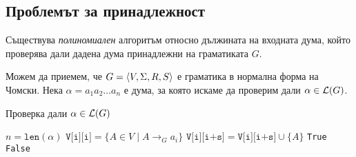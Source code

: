 \subsection{Проблемът за принадлежност}

\begin{theorem}
  Съществува {\em полиномиален} алгоритъм относно дължината на входната дума, който проверява дали дадена дума принадлежни на граматиката $G$.
\end{theorem}
Можем да приемем, че $G = \langle{V,\Sigma,R,S}\rangle$ е граматика в нормална форма на Чомски.
Нека $\alpha = a_1a_2\dots a_n$ е дума, за която искаме да проверим дали $\alpha \in \mathcal{L}(G)$.
\begin{algorithm}[H]
  \caption{Проверка дали $\alpha \in \mathcal{L}(G)$}
  \label{alg:belongs-to-grammar}
  \begin{algorithmic}[1]
    \State $n = \texttt{len}(\alpha)$ 
    \State $\texttt{V[i][i]} = \{A \in V \mid A\to_G a_i\}$ \label{alg:cyk:initial}
    \Else
    \EndIf
    \EndFor
    \ForAll{$s \in [1, n)$}  \label{alg:cyk:first-loop}
    \ForAll{$k \in [i, i + s)$}
    \State $\texttt{V[i][i+s]} = \texttt{V[i][i+s]} \cup \{A\}$ \label{alg:cyk:add-variable}
    \EndIf
    \EndFor
    \EndFor
    \EndFor
    \State \Return \texttt{True}
    \Else
    \State \Return \texttt{False}
    \EndIf
  \end{algorithmic}
\end{algorithm}

